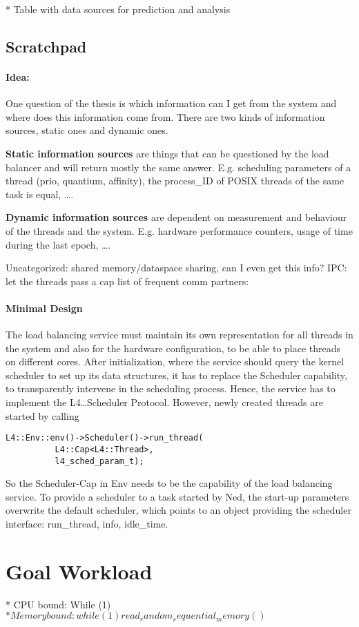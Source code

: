 * Table with data sources for prediction and analysis


\subsection{Scratchpad}
\paragraph{Idea:}
One question of the thesis is which information can I get
from the system and where does this information come from.
There are two kinds of information sources, static ones and dynamic ones.

\textbf{Static information sources} are things that can be questioned by the load
balancer and will return mostly the same answer.
E.g. scheduling parameters of a thread (prio, quantium, affinity),
the process\_ID of POSIX threads of the same task is equal,
\ldots{}.

\textbf{Dynamic information sources} are dependent on measurement and behaviour of the
threads and the system.
E.g. hardware performance counters,
usage of time during the last epoch,
\ldots{}.

Uncategorized: shared memory/dataspace sharing, can I even get this info?
IPC: let the threads pass a cap list of frequent comm partners:

\paragraph{Minimal Design}
The load balancing service must maintain its own representation for all threads
in the system and also for the hardware configuration, to be able to place
threads on different cores.
After initialization, where the service should query the kernel scheduler to
set up its data structures, it has to replace the Scheduler capability, to
transparently intervene in the scheduling process.
Hence, the service has to implement the L4\dots{}Scheduler Protocol.
However, newly created threads are started by calling
\begin{verbatim}
L4::Env::env()->Scheduler()->run_thread(
	      L4::Cap<L4::Thread>,
	      l4_sched_param_t);
\end{verbatim}
So the Scheduler-Cap in Env needs to be the capability of the load balancing
service.
To provide a scheduler to a task started by Ned, the start-up parameters
overwrite the default scheduler, which points
to an object providing the scheduler interface: run\_thread, info, idle\_time.






\section{Goal Workload}

* CPU bound: While (1)
$* Memory bound: while (1) read_random_sequential_memory ()$


\cleardoublepage

